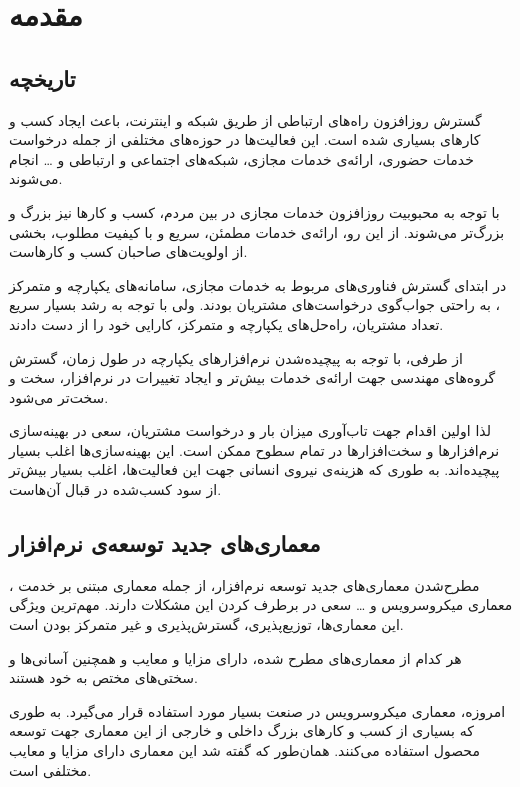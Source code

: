 \section{مقدمه}\label{sec:intro}

\subsection{تاریخچه}\label{subsec:intro_history}

گسترش روز‌افزون راه‌های ارتباطی از طریق شبکه و اینترنت، باعث ایجاد کسب‌ و کار‌های بسیاری شده است. این فعالیت‌ها در حوزه‌های مختلفی از جمله درخواست خدمات حضوری، ارائه‌ی خدمات مجازی، شبکه‌های اجتماعی و ارتباطی و … انجام می‌شوند.

با توجه به محبوبیت روز‌افزون خدمات مجازی در بین مردم، کسب و کار‌ها نیز بزرگ و بزرگ‌تر می‌شوند. از این رو، ارائه‌ی خدمات مطمئن، سریع و با کیفیت مطلوب، بخشی از اولویت‌های صاحبان کسب ‌و ‌کارهاست.

در ابتدای گسترش فناوری‌های مربوط به خدمات مجازی، سامانه‌های
یکپارچه
و متمرکز
،
به راحتی جواب‌گوی درخواست‌های مشتریان بودند. ولی با توجه به رشد بسیار سریع تعداد مشتریان، راه‌حل‌های یکپارچه و متمرکز، کارایی خود را از دست دادند.

از طرفی، با توجه به پیچیده‌شدن نرم‌افزار‌های یکپارچه در طول زمان، گسترش گروه‌های مهندسی جهت ارائه‌ی خدمات بیش‌تر و ایجاد تغییرات در نرم‌افزار، سخت و سخت‌تر می‌شود.

لذا اولین اقدام جهت تاب‌آوری میزان بار و درخواست مشتریان، سعی در بهینه‌سازی نرم‌افزار‌ها و سخت‌افزار‌ها در تمام سطوح ممکن است. این بهینه‌سازی‌ها اغلب بسیار پیچیده‌اند. به طوری که هزینه‌ی نیروی انسانی جهت این فعالیت‌ها، اغلب بسیار بیش‌تر‌ از سود کسب‌شده در قبال آن‌هاست.

\subsection{معماری‌های جدید توسعه‌ی نرم‌افزار}\label{subsec:intro_newarcs}

مطرح‌شدن معماری‌های جدید توسعه نرم‌افزار، از جمله معماری مبتنی بر خدمت
، معماری میکروسرویس
و … سعی در برطرف کردن این مشکلات دارند. مهم‌ترین ویژگی این معماری‌ها،‌ توزیع‌پذیری، گسترش‌پذیری و غیر متمرکز بودن است.

هر کدام از معماری‌های مطرح شده، دارای مزایا و معایب و همچنین آسانی‌ها و سختی‌های مختص به خود هستند.

امروزه، معماری میکروسرویس در صنعت بسیار مورد استفاده قرار می‌گیرد. به طوری که بسیاری‌ از کسب و کار‌های بزرگ داخلی و خارجی از این معماری جهت توسعه محصول استفاده می‌کنند. همان‌طور که گفته شد این معماری دارای مزایا و معایب مختلفی است.

